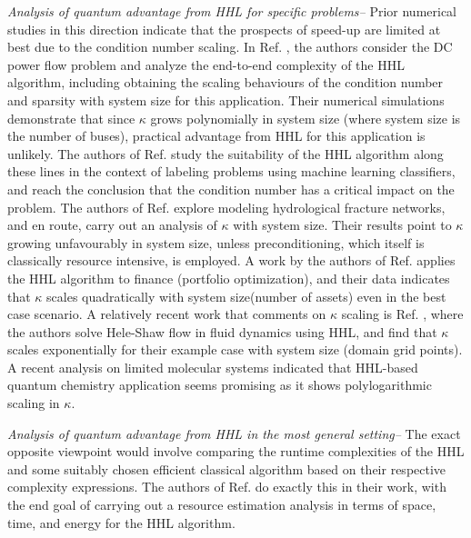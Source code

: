 \documentclass[%
 reprint,
 superscriptaddress,
 amsmath,amssymb,
 aps,
 pra,
floatfix,
nofootinbib,
]{revtex4-2}
\theoremstyle{definition}
\theoremstyle{remark}
\begin{document}
\textit{Analysis of quantum advantage from HHL for specific problems-- }Prior numerical studies in this direction indicate that the prospects of speed-up are limited at best due to the condition number scaling. In Ref. \cite{coffrin}, the authors consider the DC power flow problem and analyze the end-to-end complexity of the HHL algorithm, including obtaining the scaling behaviours of the condition number and sparsity with system size for this application. Their numerical simulations demonstrate that since $\kappa$ grows polynomially in system size (where system size is the number of buses), practical advantage from HHL for this application is unlikely. The authors of Ref. \cite{mlhhl} study the suitability of the HHL algorithm along these lines in the context of labeling problems using machine learning classifiers, and reach the conclusion that the condition number has a critical impact on the problem. The authors of Ref. \cite{hydro} explore modeling hydrological fracture networks, and en route, carry out an analysis of $\kappa$ with system size. Their results point to $\kappa$ growing unfavourably in system size, unless preconditioning, which itself is classically resource intensive, is employed. A work by the authors of Ref. \cite{yalovetzky2021hybrid} applies the HHL algorithm to finance (portfolio optimization), and their data indicates that $\kappa$ scales quadratically with system size(number of assets) even in the best case scenario. A relatively recent work that comments on $\kappa$ scaling is Ref. \cite{gopalakrishnan2024solving}, where the authors solve Hele-Shaw flow in fluid dynamics using HHL, and find that $\kappa$ scales exponentially for their example case with system size (domain grid points). A recent analysis on limited molecular systems indicated that HHL-based quantum chemistry application \cite{psihhl} seems promising as it shows polylogarithmic scaling in $\kappa$. 

\textit{Analysis of quantum advantage from HHL in the most general setting-- }The exact opposite viewpoint would involve comparing the runtime complexities of the HHL and some suitably chosen efficient classical algorithm based on their respective complexity expressions. The authors of Ref. \cite{tu2025towards} do exactly this in their work, with the end goal of carrying out a resource estimation analysis in terms of space, time, and energy for the HHL algorithm. 
\end{document}
